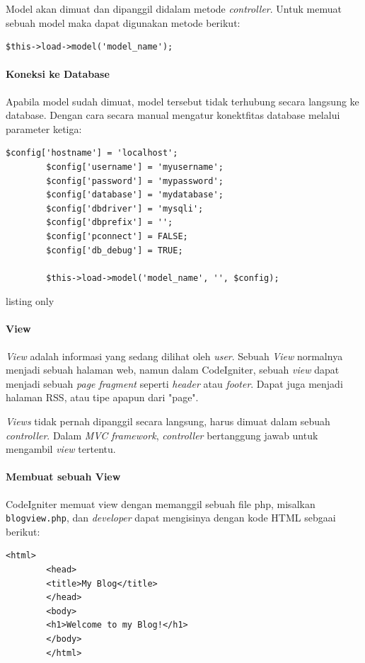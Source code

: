 \documentclass[a4paper,twoside]{article}
\begin{document}
\begin{enumerate}
		Model akan dimuat dan dipanggil didalam metode \textit{controller}. Untuk memuat sebuah model maka dapat digunakan metode berikut:
		
		\begin{lstlisting}[frame=single] 
		$this->load->model('model_name');
		\end{lstlisting}
		
		\paragraph{Koneksi ke Database}
		\label{sssec:model_3}
		Apabila model sudah dimuat, model tersebut tidak terhubung secara langsung ke database. Dengan cara secara manual mengatur konektfitas database melalui parameter ketiga:
		
		\begin{lstlisting}[frame=single]
		$config['hostname'] = 'localhost';
		$config['username'] = 'myusername';
		$config['password'] = 'mypassword';
		$config['database'] = 'mydatabase';
		$config['dbdriver'] = 'mysqli';
		$config['dbprefix'] = '';
		$config['pconnect'] = FALSE;
		$config['db_debug'] = TRUE;
		
		$this->load->model('model_name', '', $config);
		\end{lstlisting}{listing only}
		
		\paragraph{View}
		\label{subs:view}
		\textit{View} adalah informasi yang sedang dilihat oleh \textit{user}. Sebuah \textit{View} normalnya menjadi sebuah halaman web, namun dalam CodeIgniter, sebuah \textit{view} dapat menjadi sebuah \textit{page fragment} seperti \textit{header} atau \textit{footer}. Dapat juga menjadi halaman RSS, atau tipe apapun dari "page".
		
		\textit{Views} tidak pernah dipanggil secara langsung, harus dimuat dalam sebuah \textit{controller}. Dalam \textit{MVC framework}, \textit{controller} bertanggung jawab untuk mengambil \textit{view} tertentu. 
		
		\paragraph{Membuat sebuah View} \par
		CodeIgniter memuat view dengan memanggil sebuah file php, misalkan \verb|blogview.php|, dan \textit{developer} dapat mengisinya dengan kode HTML sebgaai berikut:
		\begin{lstlisting}[frame=single] 
		<html>
		<head>
		<title>My Blog</title>
		</head>
		<body>
		<h1>Welcome to my Blog!</h1>
		</body>
		</html>
		\end{lstlisting}
		

\end{enumerate}
\end{document}
